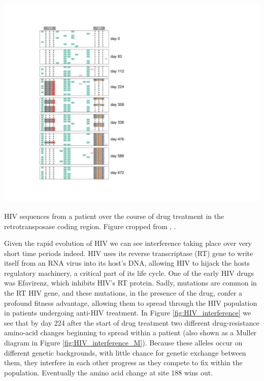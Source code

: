 \begin{marginfigure}
\begin{center}
  \includegraphics[width =  \textwidth]{Journal_figs/recom_selection/Pleuni_HIV_interference/Trimmed_HIV_interference}  %
\end{center}
\caption{HIV sequences from a patient over the course of drug treatment in the retrotransposase coding region. Figure cropped from \citet{Williams548198}, \PLOSccBY.} \label{fig:HIV_interference}  %
\end{marginfigure}
Given the rapid evolution of HIV we can see interference taking place over very short time periods indeed. HIV uses its reverse transcriptase (RT) gene to write itself from an RNA virus into its host's DNA, allowing HIV to hijack the hosts regulatory machinery, a critical part of its life cycle. One of the early HIV drugs was Efavirenz, which inhibits HIV's RT protein. Sadly, mutations are common in the RT HIV gene, and these mutations, in the presence of the drug, confer a profound fitness advantage, allowing them to spread through the HIV population in patients undergoing anti-HIV treatment. In Figure \ref{fig:HIV_interference} we see that by day 224 after the start of drug treatment two different drug-resistance amino-acid changes beginning to spread within a patient (also shown as a Muller diagram in Figure \ref{fig:HIV_interference_M}). Because these alleles occur on different genetic backgrounds, with little chance for genetic exchange between them, they interfere in each other progress as they compete to fix within the population. Eventually the amino acid change at site 188 wins out. 

